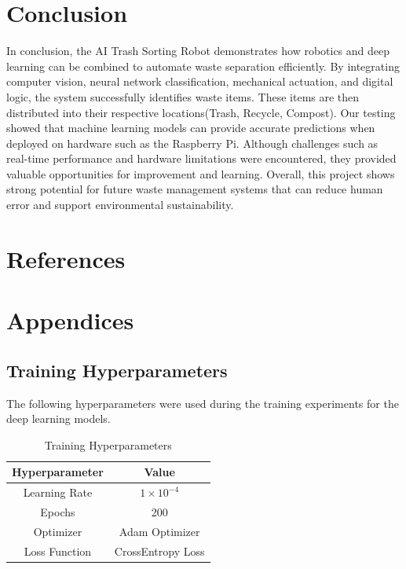\documentclass[12pt]{article}
\begin{document}
\section*{Conclusion}
\indent In conclusion, the AI Trash Sorting Robot demonstrates how robotics and deep learning can be combined to automate waste separation efficiently. By integrating computer vision, neural network classification, mechanical actuation, and digital logic, the system successfully identifies waste items. These items are then distributed into their respective locations(Trash, Recycle, Compost). Our testing showed that machine learning models can provide accurate predictions when deployed on hardware such as the Raspberry Pi. Although challenges such as real-time performance and hardware limitations were encountered, they provided valuable opportunities for improvement and learning. Overall, this project shows strong potential for future waste management systems that can reduce human error and support environmental sustainability.

\section*{References}
\nocite{*}
\printbibliography[heading=none]

\newpage
\section*{Appendices }
\subsection{Training Hyperparameters}

The following hyperparameters were used during the training experiments for the deep learning models.

\vspace{0.2cm}

\begin{table}[H]
\centering
\caption{Training Hyperparameters}
\begin{tabular}{|c|c|}
\hline
\textbf{Hyperparameter} & \textbf{Value} \\ \hline

Learning Rate & $1 \times 10^{-4}$ \\ \hline

Epochs & 200 \\ \hline

Optimizer & Adam Optimizer \\ \hline

Loss Function & CrossEntropy Loss \\ \hline

\end{tabular}
\label{tab:hyperparameters}
\end{table}
\vspace{1cm}
\end{document}
